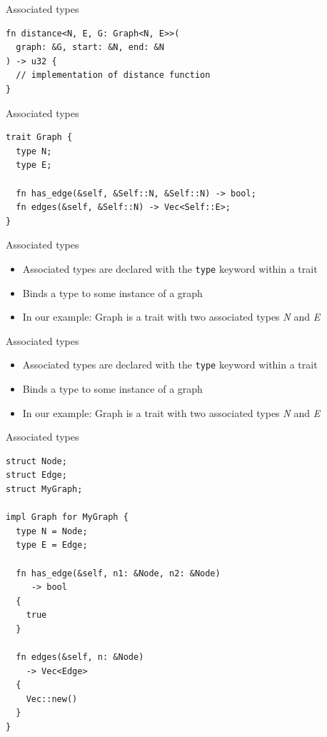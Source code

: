 \documentclass{beamer}
\begin{document}
\begin{frame}[fragile]{Associated types}
  \begin{verbatim}
fn distance<N, E, G: Graph<N, E>>(
  graph: &G, start: &N, end: &N
) -> u32 {
  // implementation of distance function
}
  \end{verbatim}
\end{frame}

\begin{frame}[fragile]{Associated types}
  \begin{verbatim}
trait Graph {
  type N;
  type E;

  fn has_edge(&self, &Self::N, &Self::N) -> bool;
  fn edges(&self, &Self::N) -> Vec<Self::E>;
}
  \end{verbatim}
\end{frame}

\begin{frame}[fragile]{Associated types}
  \begin{itemize}
    \item Associated types are declared with the \texttt{type} keyword within a trait
    \item Binds a type to some instance of a graph
    \item In our example: Graph is a trait with two associated types \emph{N} and \emph{E}
  \end{itemize}
\end{frame}


\begin{frame}[fragile]{Associated types}
  \begin{itemize}
    \item Associated types are declared with the \texttt{type} keyword within a trait
    \item Binds a type to some instance of a graph
    \item In our example: Graph is a trait with two associated types \emph{N} and \emph{E}
  \end{itemize}
\end{frame}

\begin{frame}[fragile]{Associated types}
  \begin{verbatim}
struct Node;
struct Edge;
struct MyGraph;

impl Graph for MyGraph {
  type N = Node;
  type E = Edge;

  fn has_edge(&self, n1: &Node, n2: &Node)
     -> bool
  {
    true
  }

  fn edges(&self, n: &Node)
    -> Vec<Edge>
  {
    Vec::new()
  }
}
  \end{verbatim}
\end{frame}
\end{document}
